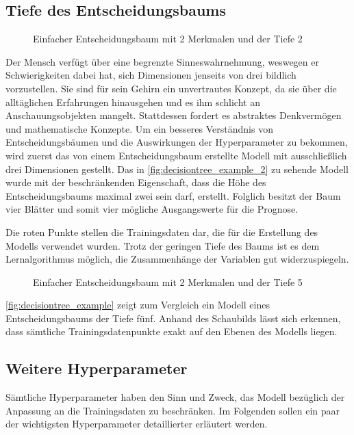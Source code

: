 \documentclass[12pt, a4paper]{article}
\begin{document}
\subsection{Tiefe des Entscheidungsbaums}

\begin{figure}[H]
\centering
\def\svgwidth{350pt}

\caption{Einfacher Entscheidungsbaum mit 2 Merkmalen und der Tiefe 2}
\label{fig:decisiontree_example_2}
\end {figure}

Der Mensch verfügt über eine begrenzte Sinneswahrnehmung, weswegen er Schwierigkeiten dabei hat, sich Dimensionen jenseits von drei bildlich vorzustellen. Sie sind für sein Gehirn ein unvertrautes Konzept, da sie über die alltäglichen Erfahrungen hinausgehen und es ihm schlicht an Anschauungsobjekten mangelt. Stattdessen fordert es abstraktes Denkvermögen und mathematische Konzepte. Um ein besseres Verständnis von Entscheidungsbäumen und die Auswirkungen der Hyperparameter zu bekommen, wird zuerst das von einem Entscheidungsbaum erstellte Modell mit ausschließlich drei Dimensionen gestellt. Das in \autoref{fig:decisiontree_example_2} zu sehende Modell wurde mit der beschränkenden Eigenschaft, dass die Höhe des Entscheidungsbaums maximal zwei sein darf, erstellt. Folglich besitzt der Baum vier Blätter und somit vier mögliche Ausgangswerte für die Prognose. 

Die roten Punkte stellen die Trainingsdaten dar, die für die Erstellung des Modells verwendet wurden. Trotz der geringen Tiefe des Baums ist es dem Lernalgorithmus möglich, die Zusammenhänge der Variablen gut widerzuspiegeln.


\begin{figure}[H]
\centering
\def\svgwidth{350pt}

\caption{Einfacher Entscheidungsbaum mit 2 Merkmalen und der Tiefe 5}
\label{fig:decisiontree_example}
\end {figure}

\autoref{fig:decisiontree_example} zeigt zum Vergleich ein Modell eines Entscheidungsbaums der Tiefe fünf. Anhand des Schaubilds lässt sich erkennen, dass sämtliche Trainingsdatenpunkte exakt auf den Ebenen des Modells liegen. 

\subsection{Weitere Hyperparameter}

Sämtliche Hyperparameter haben den Sinn und Zweck, das Modell bezüglich der Anpassung an die Trainingsdaten zu beschränken. Im Folgenden sollen ein paar der wichtigsten Hyperparameter detaillierter erläutert werden.
\end{document}

